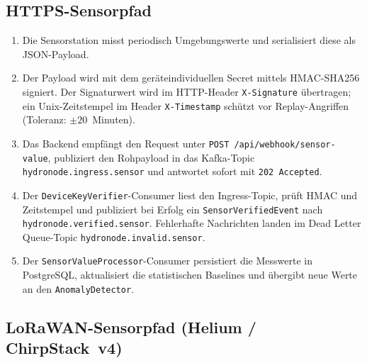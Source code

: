 \subsection*{HTTPS-Sensorpfad}

\begin{enumerate}
  \item Die Sensorstation misst periodisch Umgebungswerte und serialisiert diese als JSON-Payload.
  \item Der Payload wird mit dem geräteindividuellen Secret mittels HMAC-SHA256 signiert.
        Der Signaturwert wird im HTTP-Header \texttt{X-Signature} übertragen;
        ein Unix-Zeitstempel im Header \texttt{X-Timestamp} schützt vor Replay-Angriffen
        (Toleranz: $\pm20$~Minuten).
  \item Das Backend empfängt den Request unter \texttt{POST /api/webhook/sensor-value},
        publiziert den Rohpayload in das Kafka-Topic \texttt{hydronode.ingress.sensor} und
        antwortet sofort mit \texttt{202 Accepted}.
  \item Der \texttt{DeviceKeyVerifier}-Consumer liest den Ingress-Topic, prüft HMAC und
        Zeitstempel und publiziert bei Erfolg ein \texttt{SensorVerifiedEvent} nach
        \texttt{hydronode.verified.sensor}. Fehlerhafte Nachrichten landen im
        Dead Letter Queue-Topic \texttt{hydronode.invalid.sensor}.
  \item Der \texttt{SensorValueProcessor}-Consumer persistiert die Messwerte in PostgreSQL,
        aktualisiert die statistischen Baselines und übergibt neue Werte an den
        \texttt{AnomalyDetector}.
\end{enumerate}

\subsection*{LoRaWAN-Sensorpfad (Helium / ChirpStack~v4)}

